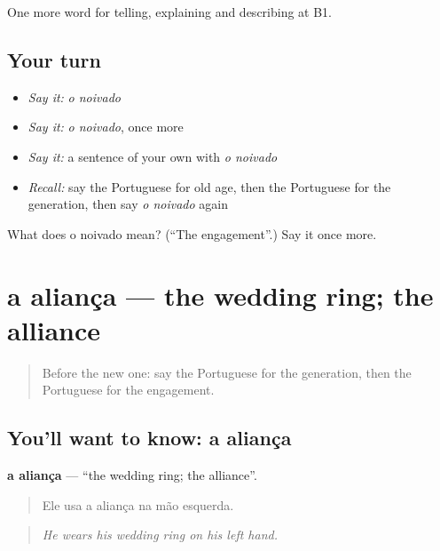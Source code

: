 \begin{grammarlens}[title={What you've built}]
One more word for telling, explaining and describing at B1.
\end{grammarlens}

\subsection*{Your turn}
\begin{itemize}
\raggedright
  \item \emph{Say it:} \emph{o noivado}
  \item \emph{Say it:} \emph{o noivado}, once more
  \item \emph{Say it:} a sentence of your own with \emph{o noivado}
  \item \emph{Recall:} say the Portuguese for old age, then the Portuguese for the generation, then say \emph{o noivado} again
\end{itemize}

\begin{tcolorbox}[breakable,colback=teal!4,colframe=teal!35!black,title={Before you move on}]
What does o noivado mean? (\textquotedblleft{}The engagement\textquotedblright{}.) Say it once more.
\end{tcolorbox}
\section[a aliança]{a aliança — the wedding ring; the alliance}

\label{lesson:PT-C312-alianca}



\begin{quote}
Before the new one: say the Portuguese for the generation, then the Portuguese for the engagement.
\end{quote}

\subsection*{You'll want to know: a aliança}
\textbf{a aliança} — \textquotedblleft{}the wedding ring; the alliance\textquotedblright{}.

\begin{quote}
Ele usa a aliança na mão esquerda.
\end{quote}

\begin{quote}
\emph{He wears his wedding ring on his left hand.}
\end{quote}

